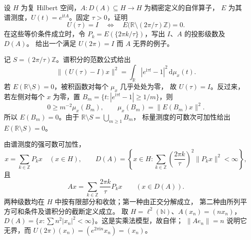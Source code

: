 \begin{optionalexercise}\label{b1:ex:29-periodic-group}
设 \(H\) 为复 Hilbert 空间，\(A:D(A)\subseteq H\to H\) 为稠密定义的自伴算子，
\(E\) 为其谱测度，\(U(t)=e^{\mathrm itA}\)。固定 \(\tau>0\)，证明
\[
 U(\tau)=I
 \quad\Longleftrightarrow\quad
 E\bigl(\mathbb R\setminus(2\pi/\tau)\mathbb Z\bigr)=0.
\]
在这些等价条件成立时，令 \(P_k=E(\{2\pi k/\tau\})\)，写出 \(I\)、\(A\) 的投影级数及 \(D(A)\)。
给出一个满足 \(U(2\pi)=I\) 而 \(A\) 无界的例子。
\end{optionalexercise}
\begin{solution}
记 \(S=(2\pi/\tau)\mathbb Z\)。谱积分的范数公式给出
\[
 \|(U(\tau)-I)x\|^2
 =\int_{\mathbb R}|e^{\mathrm i\tau t}-1|^2\,\mathrm d\mu_x(t).
\]
若 \(E(\mathbb R\setminus S)=0\)，被积函数对每个 \(\mu_x\) 几乎处处为零，
故 \(U(\tau)=I\)。反过来，若左侧对每个 \(x\) 为零，置
\(B_m=\{t:|e^{\mathrm i\tau t}-1|\geq1/m\}\)，则
\[
 0\geq m^{-2}\mu_x(B_m),\qquad \mu_x(B_m)=\|E(B_m)x\|^2.
\]
所以 \(E(B_m)=0\)。由于 \(\mathbb R\setminus S=\bigcup_{m\geq1}B_m\)，
标量测度的可数次可加性给出 \(E(\mathbb R\setminus S)=0\)。

由谱测度的强可数可加性，
\[
 x=\sum_{k\in\mathbb Z}P_kx\quad(x\in H),\qquad
 D(A)=\left\{x\in H:\sum_{k\in\mathbb Z}
       \left(\frac{2\pi k}{\tau}\right)^2\|P_kx\|^2<\infty\right\},
\]
且
\[
 Ax=\sum_{k\in\mathbb Z}\frac{2\pi k}{\tau}P_kx\qquad(x\in D(A)).
\]
两种级数均在 \(H\) 中按有限部分和收敛；第一种由正交分解成立，
第二种由所列平方可和条件及谱积分的截断定义成立。
取 \(H=\ell^2(\mathbb N)\)、\(A(x_n)=(nx_n)\)，
\(D(A)=\{x:\sum n^2|x_n|^2<\infty\}\)。这是实乘法模型，故自伴；
\(\|Ae_n\|=n\) 说明它无界，而 \(U(2\pi)(x_n)=(e^{2\pi\mathrm in}x_n)=(x_n)\)。
\end{solution}

